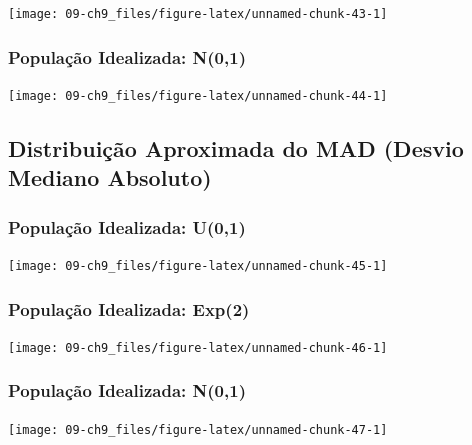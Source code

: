 \documentclass[
]{book}
\theoremstyle{definition}
\theoremstyle{definition}
\theoremstyle{definition}
\theoremstyle{remark}
\begin{document}
\texttt{[image: 09-ch9\_files/figure-latex/unnamed-chunk-43-1]}

\hypertarget{populauxe7uxe3o-idealizada-n01-2}{%
\subsubsection*{População Idealizada: N(0,1)}\label{populauxe7uxe3o-idealizada-n01-2}}

\texttt{[image: 09-ch9\_files/figure-latex/unnamed-chunk-44-1]}

\hypertarget{distribuiuxe7uxe3o-aproximada-do-mad-desvio-mediano-absoluto}{%
\subsection*{Distribuição Aproximada do MAD (Desvio Mediano Absoluto)}\label{distribuiuxe7uxe3o-aproximada-do-mad-desvio-mediano-absoluto}}

\hypertarget{populauxe7uxe3o-idealizada-u01-3}{%
\subsubsection*{População Idealizada: U(0,1)}\label{populauxe7uxe3o-idealizada-u01-3}}

\texttt{[image: 09-ch9\_files/figure-latex/unnamed-chunk-45-1]}

\hypertarget{populauxe7uxe3o-idealizada-exp2-3}{%
\subsubsection*{População Idealizada: Exp(2)}\label{populauxe7uxe3o-idealizada-exp2-3}}

\texttt{[image: 09-ch9\_files/figure-latex/unnamed-chunk-46-1]}

\hypertarget{populauxe7uxe3o-idealizada-n01-3}{%
\subsubsection*{População Idealizada: N(0,1)}\label{populauxe7uxe3o-idealizada-n01-3}}

\texttt{[image: 09-ch9\_files/figure-latex/unnamed-chunk-47-1]}
\end{document}
